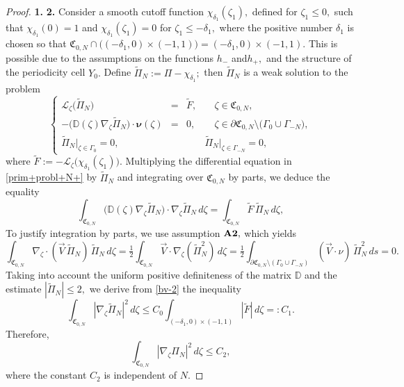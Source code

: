 \documentclass[reqno]{amsart}            %
\numberwithin{equation}{section}
\begin{document}
\begin{proof}{\bf 1.}
		{\bf 2.} Consider a smooth cutoff function $\chi_{\delta_1}(\zeta_1),$ defined for  $\zeta_1 \le 0,$ such that $\chi_{\delta_1}(0) =1$ and
		$\chi_{\delta_1}(\zeta_1) = 0$ for $\zeta_1 \le -\delta_1,$ where the positive number $\delta_1$ is chosen so that 
		$\mathfrak{C}_{0,N} \cap \big((-\delta_1,0)\times (-1, 1)\big)= (-\delta_1,0)\times (-1, 1).$  This is possible due to the assumptions on the functions $h_-$ and$h_+,$ and the structure of the periodicity cell $Y_0.$ Define $\widetilde{\Pi}_N := \Pi - \chi_{\delta_1};$ then $\widetilde{\Pi}_N$  is a weak solution to the problem
		\begin{equation}\label{prim+probl+N+}
			\left\{\begin{array}{rcll}
				\mathcal{L}_{\zeta}\big(\widetilde{\Pi}_{N}\big)
				& =    & \widetilde{F},
				& \quad \zeta\in \mathfrak{C}_{0,N},
				\\[2mm]
				-\big(\mathbb{D}(\zeta)\nabla_{\zeta}\widetilde{\Pi}_{N}\big) \cdot \boldsymbol{\nu}(\zeta) & =
				& 0,
				& \quad \zeta\in \partial\mathfrak{C}_{0,N} \setminus \big(\Gamma_0 \cup \Gamma_{-N}\big),
				\\[2mm]
				\widetilde{\Pi}_{N}\big|_{\zeta\in \Gamma_0} = 0, & & &\widetilde{\Pi}_{N}\big|_{\zeta\in \Gamma_{-N}} = 0,
			\end{array}\right.
		\end{equation}
		where $\widetilde{F} := -\mathcal{L}_{\zeta}\big(\chi_{\delta_1}(\zeta_1)\big).$ Multiplying the differential equation in \eqref{prim+probl+N+} by $\widetilde{\Pi}_N$ and integrating over $\mathfrak{C}_{0,N}$ by parts, we deduce
		the equality
		\begin{equation}\label{bv-2}
			\int_{\mathfrak{C}_{0,N}}\big(\mathbb{D}(\zeta)\nabla_{\zeta}\widetilde{\Pi}_N\big) \cdot \nabla_{\zeta}\widetilde{\Pi}_N\, d\zeta
			= \int_{\mathfrak{C}_{0,N}}\widetilde{F} \, \widetilde{\Pi}_N\, d\zeta,
		\end{equation}
		To justify integration by parts, we use assumption ${\bf A2},$ which yields
		\[
		\int_{\mathfrak C_{0,N}}\nabla_{\zeta}\cdot (\overrightarrow V\, \widetilde{\Pi}_N)\, \widetilde{\Pi}_N\,d\zeta
		=\tfrac12\int_{\mathfrak C_{0,N}}\overrightarrow V\cdot\nabla_{\zeta}(\widetilde{\Pi}_N^2)\,d\zeta
		=\tfrac12\int_{\partial\mathfrak C_{0,N}\setminus (\Gamma_0 \cup \Gamma_{-N})}(\overrightarrow V\cdot\nu)\,\widetilde{\Pi}_N^2\,ds =0.
		\]
		Taking into account the uniform positive definiteness of the matrix $\mathbb{D}$ and the estimate $|\widetilde{\Pi}_N| \le 2,$  we derive  from \eqref{bv-2} the inequality
		\begin{equation*}
			\int_{\mathfrak{C}_{0,N}}|\nabla_{\zeta}\widetilde{\Pi}_N|^2\, d\zeta
			\le C_0 \int_{(-\delta_1,0)\times (-1, 1)}|\widetilde{F}| \, d\zeta =: C_1.
		\end{equation*}
		Therefore,
		\begin{equation}\label{bv-3}
			\int_{\mathfrak{C}_{0,N}}|\nabla_{\zeta}{\Pi}_N|^2\, d\zeta
			\le  C_2,
		\end{equation}
		where the constant $C_2$ is independent of $N.$
		

\end{proof}
\end{document}
